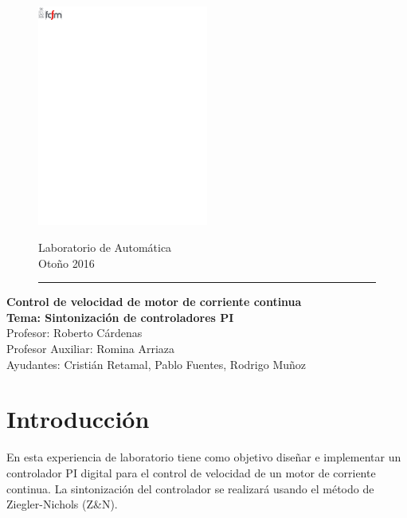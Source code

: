 \documentclass[11pt,letterpaper,notitlepage]{article}
\begin{document}
\begin{figure}
\vspace*{-1cm}
\begin{minipage}[c]{0.4\textwidth}
	\includegraphics[width=0.5\textwidth]{fcfm}
\end{minipage}
\hfill
    \begin{minipage}[t]{0.6\textwidth}
    \begin{flushright}
    	Laboratorio de Automática\\
    	Otoño 2016 \\
    \end{flushright}
\end{minipage}
\rule{\linewidth}{.4mm}
\end{figure}

\begin{center}
\Large \textbf{Control de velocidad de motor de corriente continua} \\
\large \textbf{Tema: Sintonización de controladores PI}\\
\large Profesor: Roberto Cárdenas\\
\large Profesor Auxiliar: Romina Arriaza\\
\large Ayudantes: Cristián Retamal, Pablo Fuentes, Rodrigo Muñoz\\
\end{center}

\section{Introducción}

En esta experiencia de laboratorio tiene como objetivo diseñar e implementar un controlador PI digital para el control de velocidad de un motor de corriente continua. La sintonización del controlador se realizará usando el método de Ziegler-Nichols (Z\&N).
\end{document}
